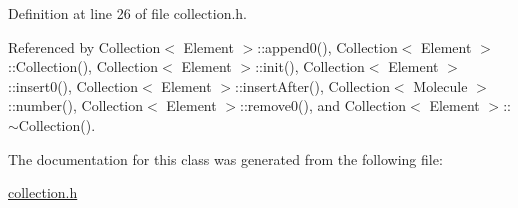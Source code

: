 Definition at line 26 of file collection.h.

Referenced by Collection$<$ Element $>$::append0(), Collection$<$ Element $>$::Collection(), Collection$<$ Element $>$::init(), Collection$<$ Element $>$::insert0(), Collection$<$ Element $>$::insertAfter(), Collection$<$ Molecule $>$::number(), Collection$<$ Element $>$::remove0(), and Collection$<$ Element $>$::$\sim$Collection().

The documentation for this class was generated from the following file:\begin{CompactItemize}
\item 
\hyperlink{collection_8h}{collection.h}\end{CompactItemize}
